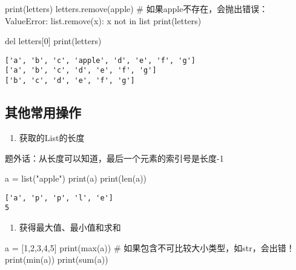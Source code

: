 \documentclass[
  letterpaper,
  DIV=11,
  numbers=noendperiod]{scrreprt}
\newenvironment{Shaded}{\begin{snugshade}}{\end{snugshade}}
\newcommand{\BuiltInTok}[1]{\textcolor[rgb]{0.00,0.23,0.31}{#1}}
\newcommand{\CommentTok}[1]{\textcolor[rgb]{0.37,0.37,0.37}{#1}}
\newcommand{\DecValTok}[1]{\textcolor[rgb]{0.68,0.00,0.00}{#1}}
\newcommand{\KeywordTok}[1]{\textcolor[rgb]{0.00,0.23,0.31}{#1}}
\newcommand{\NormalTok}[1]{\textcolor[rgb]{0.00,0.23,0.31}{#1}}
\newcommand{\OperatorTok}[1]{\textcolor[rgb]{0.37,0.37,0.37}{#1}}
\newcommand{\StringTok}[1]{\textcolor[rgb]{0.13,0.47,0.30}{#1}}
\providecommand{\tightlist}{%
  \setlength{\itemsep}{0pt}\setlength{\parskip}{0pt}}\usepackage{longtable,booktabs,array}
\begin{document}
\begin{Shaded}
\begin{Highlighting}[]
\BuiltInTok{print}\NormalTok{(letters)}
\NormalTok{letters.remove(}\StringTok{\textquotesingle{}apple\textquotesingle{}}\NormalTok{) }\CommentTok{\# 如果\textquotesingle{}apple\textquotesingle{}不存在，会抛出错误：ValueError: list.remove(x): x not in list}
\BuiltInTok{print}\NormalTok{(letters)}

\KeywordTok{del}\NormalTok{ letters[}\DecValTok{0}\NormalTok{]}
\BuiltInTok{print}\NormalTok{(letters)}
\end{Highlighting}
\end{Shaded}

\begin{verbatim}
['a', 'b', 'c', 'apple', 'd', 'e', 'f', 'g']
['a', 'b', 'c', 'd', 'e', 'f', 'g']
['b', 'c', 'd', 'e', 'f', 'g']
\end{verbatim}

\hypertarget{ux5176ux4ed6ux5e38ux7528ux64cdux4f5c}{%
\subsection{其他常用操作}\label{ux5176ux4ed6ux5e38ux7528ux64cdux4f5c}}

\begin{enumerate}
\def\labelenumi{\arabic{enumi}.}
\tightlist
\item
  获取的List的长度
\end{enumerate}

题外话：从长度可以知道，最后一个元素的索引号是长度-1

\begin{Shaded}
\begin{Highlighting}[]
\NormalTok{a }\OperatorTok{=} \BuiltInTok{list}\NormalTok{(}\StringTok{"apple"}\NormalTok{)}
\BuiltInTok{print}\NormalTok{(a)}
\BuiltInTok{print}\NormalTok{(}\BuiltInTok{len}\NormalTok{(a))}
\end{Highlighting}
\end{Shaded}

\begin{verbatim}
['a', 'p', 'p', 'l', 'e']
5
\end{verbatim}

\begin{enumerate}
\def\labelenumi{\arabic{enumi}.}
\setcounter{enumi}{1}
\tightlist
\item
  获得最大值、最小值和求和
\end{enumerate}

\begin{Shaded}
\begin{Highlighting}[]
\NormalTok{a }\OperatorTok{=}\NormalTok{ [}\DecValTok{1}\NormalTok{,}\DecValTok{2}\NormalTok{,}\DecValTok{3}\NormalTok{,}\DecValTok{4}\NormalTok{,}\DecValTok{5}\NormalTok{]}
\BuiltInTok{print}\NormalTok{(}\BuiltInTok{max}\NormalTok{(a)) }\CommentTok{\# 如果包含不可比较大小类型，如str，会出错！}
\BuiltInTok{print}\NormalTok{(}\BuiltInTok{min}\NormalTok{(a))}
\BuiltInTok{print}\NormalTok{(}\BuiltInTok{sum}\NormalTok{(a))}
\end{Highlighting}
\end{Shaded}
\end{document}
